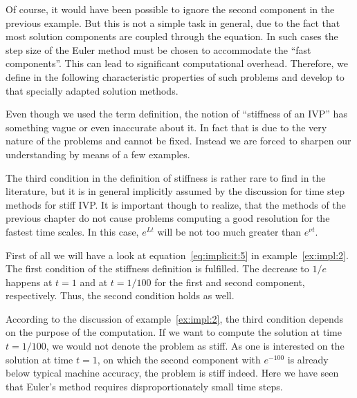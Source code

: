 \begin{remark}
  Of course, it would have been possible to ignore the second
  component in the previous example. But this is not a simple task in
  general, due to the fact that most solution components are
  coupled through the equation.  In such cases the step size of the
  Euler method must be chosen to accommodate the ``fast
  components''. This can lead to significant computational overhead.
  Therefore, we define in the following characteristic
  properties of such problems and develop to that specially adapted
  solution methods.
\end{remark}



\begin{remark}
  Even though we used the term definition, the notion of ``stiffness
  of an IVP'' has something vague or even inaccurate about it. In fact
  that is due to the very nature of the problems and cannot be fixed.
  Instead we are forced to sharpen our understanding by means of a few
  examples.
\end{remark}

\begin{remark}
  The third condition in the definition of stiffness is rather rare to
  find in the literature, but it is in general implicitly assumed by
  the discussion for time step methods for stiff IVP.  It is important
  though to realize, that the methods of the previous chapter do not
  cause problems computing a good resolution for the fastest time
  scales. In this case, $e^{Lt}$ will be not too much greater than
  $e^{\nu t}$.
\end{remark}

\begin{example}
  \label{ex:impl:2a}
  First of all we will have a look at equation~\eqref{eq:implicit:5}
  in example~\ref{ex:impl:2}. The first condition of the stiffness
  definition is fulfilled. The decrease to $1/e$ happens at $t=1$ and
  at $t=1/100$ for the first and second component, respectively.
  Thus, the second condition holds as well.
  
  According to the discussion of example~\ref{ex:impl:2}, the third
  condition depends on the purpose of the computation.  If we want
  to compute the solution at time $t=1/100$, we would not denote the
  problem as stiff. As one is interested on the solution at time
  $t=1$, on which the second component with $e^{-100}$ is already
  below typical machine accuracy, the problem is stiff indeed. Here
  we have seen that Euler's method requires disproportionately small
  time steps.
\end{example}

